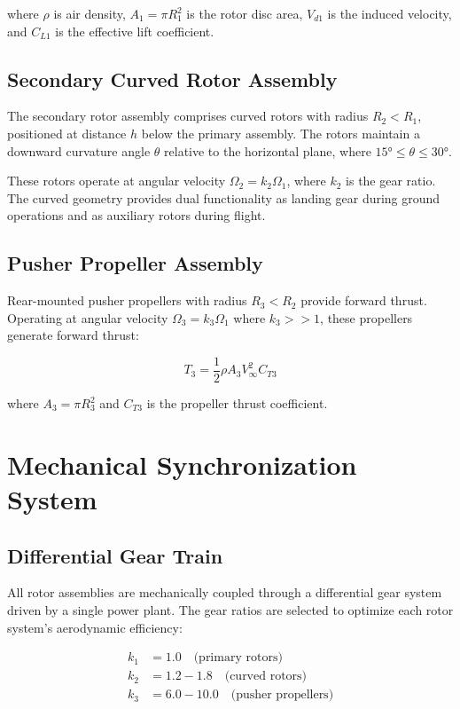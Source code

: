 \documentclass[12pt,a4paper]{article}
\begin{document}
where $\rho$ is air density, $A_1 = \pi R_1^2$ is the rotor disc area, $V_{d1}$ is the induced velocity, and $C_{L1}$ is the effective lift coefficient.

\subsection{Secondary Curved Rotor Assembly}

The secondary rotor assembly comprises curved rotors with radius $R_2 < R_1$, positioned at distance $h$ below the primary assembly. The rotors maintain a downward curvature angle $\theta$ relative to the horizontal plane, where $15° \leq \theta \leq 30°$.

These rotors operate at angular velocity $\Omega_2 = k_2 \Omega_1$, where $k_2$ is the gear ratio. The curved geometry provides dual functionality as landing gear during ground operations and as auxiliary rotors during flight.

\subsection{Pusher Propeller Assembly}

Rear-mounted pusher propellers with radius $R_3 < R_2$ provide forward thrust. Operating at angular velocity $\Omega_3 = k_3 \Omega_1$ where $k_3 >> 1$, these propellers generate forward thrust:

\begin{equation}
T_3 = \frac{1}{2}\rho A_3 V_\infty^2 C_{T3}
\end{equation}

where $A_3 = \pi R_3^2$ and $C_{T3}$ is the propeller thrust coefficient.

\section{Mechanical Synchronization System}

\subsection{Differential Gear Train}

All rotor assemblies are mechanically coupled through a differential gear system driven by a single power plant. The gear ratios are selected to optimize each rotor system's aerodynamic efficiency:

\begin{align}
k_1 &= 1.0 \quad \text{(primary rotors)} \\
k_2 &= 1.2-1.8 \quad \text{(curved rotors)} \\
k_3 &= 6.0-10.0 \quad \text{(pusher propellers)}
\end{align}
\end{document}
